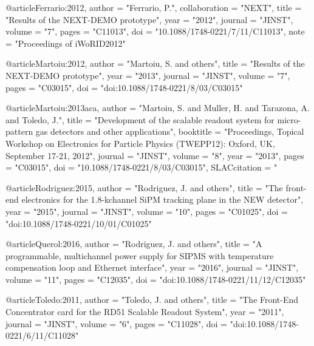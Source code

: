 {{@article{Ferrario:2012,
      author        = "Ferrario, P.",
      collaboration = "NEXT",
      title         = "Results of the NEXT-DEMO prototype",
      year          = "2012",
      journal        = "JINST",
      volume         = "7",
      pages          = "C11013",
      doi            = "10.1088/1748-0221/7/11/C11013",
      note          = "Proceedings of iWoRID2012"
}

@article{Martoiu:2012,
      author        = "Martoiu, S. and others",
      title         = "Results of the NEXT-DEMO prototype",
      year          = "2013",
      journal        = "JINST",
      volume         = "7",
      pages          = "C03015",
      doi            = "doi:10.1088/1748-0221/8/03/C03015"
}

@article{Martoiu:2013aca,
      author         = "Martoiu, S. and Muller, H. and Tarazona, A. and Toledo,
                        J.",
      title          = "{Development of the scalable readout system for
                        micro-pattern gas detectors and other applications}",
      booktitle      = "{Proceedings, Topical Workshop on Electronics for
                        Particle Physics (TWEPP12): Oxford, UK, September 17-21,
                        2012}",
      journal        = "JINST",
      volume         = "8",
      year           = "2013",
      pages          = "C03015",
      doi            = "10.1088/1748-0221/8/03/C03015",
      SLACcitation   = "%
}

@article{Rodriguez:2015,
      author        = "Rodriguez, J. and others",
      title         = "The front-end electronics for the 1.8-kchannel SiPM tracking plane in the NEW detector",
      year          = "2015",
      journal        = "JINST",
      volume         = "10",
      pages          = "C01025",
      doi            = "doi:10.1088/1748-0221/10/01/C01025"
}

@article{Querol:2016,
      author        = "Rodriguez, J. and others",
      title         = "A programmable, multichannel power supply for SIPMS with temperature compensation loop and Ethernet interface",
      year          = "2016",
      journal        = "JINST",
      volume         = "11",
      pages          = "C12035",
      doi            = "doi:10.1088/1748-0221/11/12/C12035"
}

@article{Toledo:2011,
      author        = "Toledo, J. and others",
      title         = "The Front-End Concentrator card for the {RD}51 Scalable Readout System",
      year          = "2011",
      journal        = "JINST",
      volume         = "6",
      pages          = "C11028",
      doi            = "doi:10.1088/1748-0221/6/11/C11028"
}

}}
